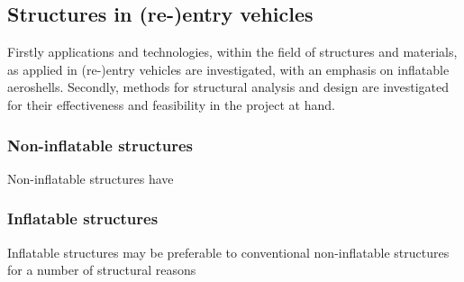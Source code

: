 \subsection{Structures in (re-)entry vehicles}\label{sec:struc}
Firstly applications and technologies, within the field of structures and materials, as applied in (re-)entry vehicles are investigated, with an emphasis on inflatable aeroshells. Secondly, methods for structural analysis and design are investigated for their effectiveness and feasibility in the project at hand.

\subsubsection{Non-inflatable structures}
Non-inflatable structures have

\subsubsection{Inflatable structures}
Inflatable structures may be preferable to conventional non-inflatable structures for a number of structural reasons 




